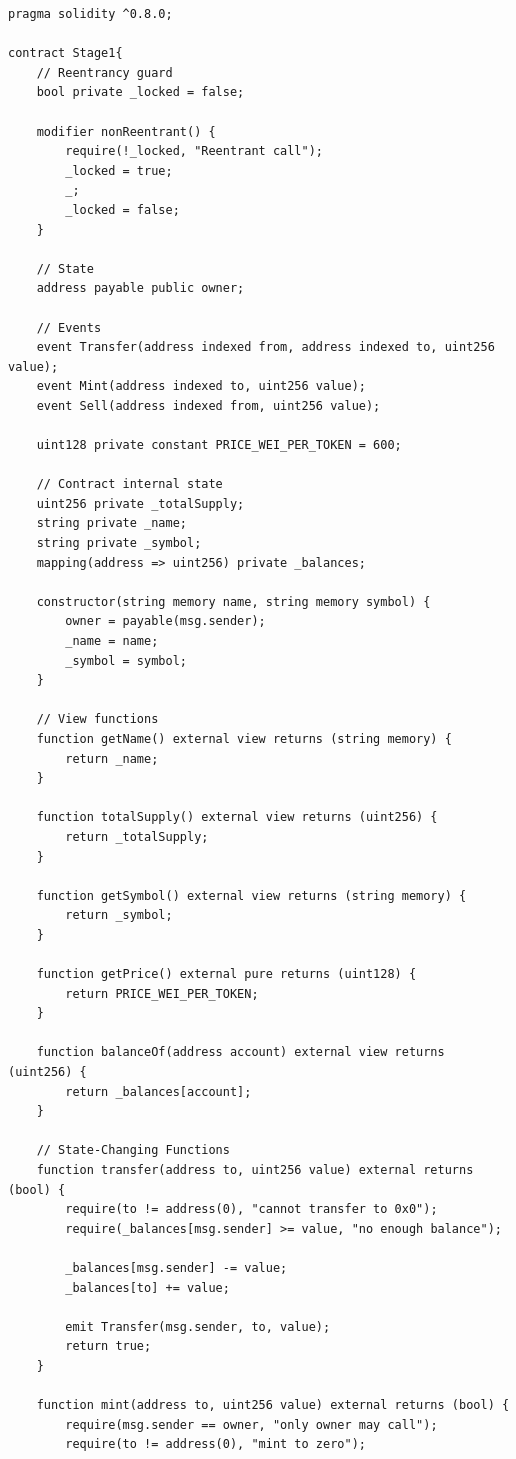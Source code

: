 \documentclass[10pt,a4paper]{article}
\begin{document}
\begin{lstlisting}
pragma solidity ^0.8.0;

contract Stage1{
    // Reentrancy guard
    bool private _locked = false;
    
    modifier nonReentrant() {
        require(!_locked, "Reentrant call");
        _locked = true;
        _;
        _locked = false;
    }
    
    // State 
    address payable public owner;
    
    // Events
    event Transfer(address indexed from, address indexed to, uint256 value);
    event Mint(address indexed to, uint256 value);
    event Sell(address indexed from, uint256 value);

    uint128 private constant PRICE_WEI_PER_TOKEN = 600;

    // Contract internal state
    uint256 private _totalSupply;
    string private _name;
    string private _symbol;
    mapping(address => uint256) private _balances;

    constructor(string memory name, string memory symbol) {
        owner = payable(msg.sender);
        _name = name;
        _symbol = symbol;
    }

    // View functions
    function getName() external view returns (string memory) {
        return _name;
    }

    function totalSupply() external view returns (uint256) {
        return _totalSupply;
    }

    function getSymbol() external view returns (string memory) {
        return _symbol;
    }

    function getPrice() external pure returns (uint128) {
        return PRICE_WEI_PER_TOKEN;
    }

    function balanceOf(address account) external view returns (uint256) {
        return _balances[account];
    }

    // State-Changing Functions
    function transfer(address to, uint256 value) external returns (bool) {
        require(to != address(0), "cannot transfer to 0x0");
        require(_balances[msg.sender] >= value, "no enough balance");

        _balances[msg.sender] -= value;
        _balances[to] += value;

        emit Transfer(msg.sender, to, value);
        return true;
    }

    function mint(address to, uint256 value) external returns (bool) {
        require(msg.sender == owner, "only owner may call");
        require(to != address(0), "mint to zero");


\end{lstlisting}
\end{document}
